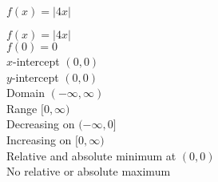 {$f(x) = |4x|$}
{$f(x) = |4x|$ \\ $f(0) = 0$ \\ $x$-intercept $(0, 0)$ \\ $y$-intercept $(0, 0)$ \\ Domain $(-\infty, \infty)$ \\ Range $[0, \infty)$ \\ Decreasing on $(-\infty, 0]$ \\ Increasing on $[0, \infty)$ \\ Relative and absolute minimum at $(0, 0)$ \\ No relative or absolute maximum 

\begin{center}
\end{center}}